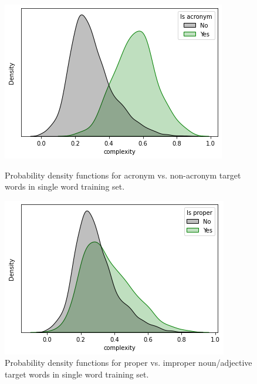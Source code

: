 \documentclass{dcthesis}
\theoremstyle{definition}
\theoremstyle{remark}
\begin{document}
\begin{figure}
    \centering
    \begin{minipage}[b]{0.45\textwidth}
        \includegraphics[width=\textwidth]{is_acronym.png}
        \caption{\label{fig:is_acronym} Probability density functions for acronym vs. non-acronym target words in single word training set.}
    \end{minipage}
    \hfill
    \begin{minipage}[b]{0.45\textwidth}
        \includegraphics[width=\textwidth]{is_proper.png}
        \caption{\label{fig:is_proper} Probability density functions for proper vs. improper noun/adjective target words in single word training set.}
    \end{minipage}
\end{figure}
\end{document}
